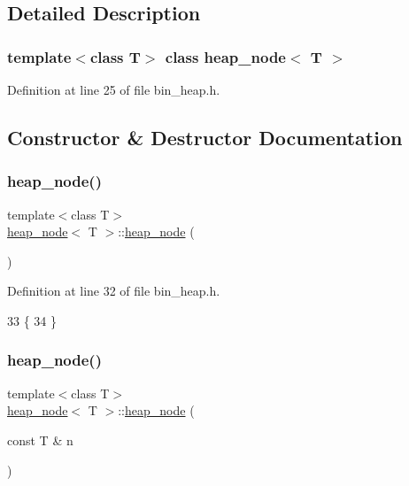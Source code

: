 \subsection{Detailed Description}
\subsubsection*{template$<$class T$>$\newline
class heap\+\_\+node$<$ T $>$}



Definition at line 25 of file bin\+\_\+heap.\+h.



\subsection{Constructor \& Destructor Documentation}
\mbox{\label{classheap__node_a28a9434410001fe7fc975901ec6b7b33}} 
\subsubsection{\texorpdfstring{heap\+\_\+node()}{heap\_node()}\hspace{0.1cm}{\footnotesize\ttfamily [1/2]}}
{\footnotesize\ttfamily template$<$class T$>$ \\
\mbox{\hyperlink{classheap__node}{heap\+\_\+node}}$<$ T $>$\+::\mbox{\hyperlink{classheap__node}{heap\+\_\+node}} (\begin{DoxyParamCaption}{ }\end{DoxyParamCaption})\hspace{0.3cm}{\ttfamily [inline]}}



Definition at line 32 of file bin\+\_\+heap.\+h.


\begin{DoxyCode}
33     \{
34     \}
\end{DoxyCode}
\mbox{\label{classheap__node_a5f7209d13a6e95fe84770ea15c6a77b1}} 
\subsubsection{\texorpdfstring{heap\+\_\+node()}{heap\_node()}\hspace{0.1cm}{\footnotesize\ttfamily [2/2]}}
{\footnotesize\ttfamily template$<$class T$>$ \\
\mbox{\hyperlink{classheap__node}{heap\+\_\+node}}$<$ T $>$\+::\mbox{\hyperlink{classheap__node}{heap\+\_\+node}} (\begin{DoxyParamCaption}\item[{const T \&}]{n }\end{DoxyParamCaption})\hspace{0.3cm}{\ttfamily [inline]}}



